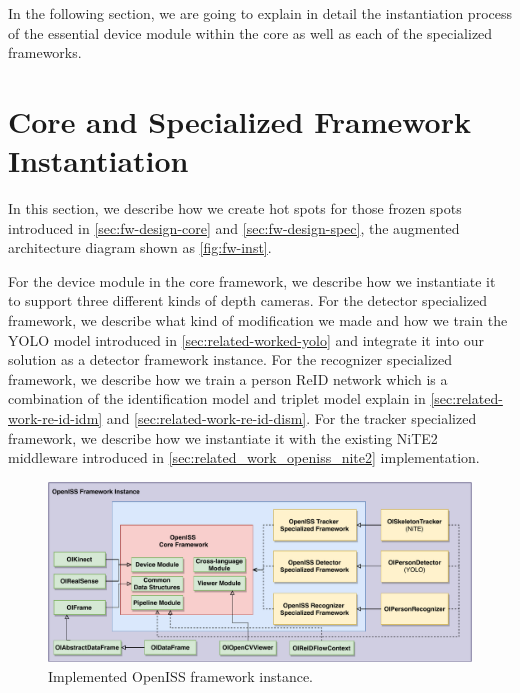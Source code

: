 
In the following section, we are going to explain in detail the instantiation
process of the essential device module within the core as well as each of the 
specialized frameworks.

\section{Core and Specialized Framework Instantiation}
\label{sec:fw-inst-core-and-spec}

In this section, we describe how we create hot spots for those frozen spots
introduced in \autoref{sec:fw-design-core} and \autoref{sec:fw-design-spec},
the augmented architecture diagram shown as \autoref{fig:fw-inst}.

For the device module in the core framework, we describe how we instantiate it 
to support three different kinds of depth cameras.
For the detector specialized framework, we describe what kind of modification we
made and how we train the YOLO model introduced in
\autoref{sec:related-worked-yolo} and integrate it into our solution as a
detector framework instance.
For the recognizer specialized framework, we describe how we train a person 
ReID network which is a combination of the identification model and triplet 
model explain in \autoref{sec:related-work-re-id-idm} and  
\autoref{sec:related-work-re-id-dism}.
For the tracker specialized framework, we describe how we instantiate it with 
the existing NiTE2 middleware introduced in 
\autoref{sec:related_work_openiss_nite2} implementation.

\begin{figure}
    \includegraphics[width=\linewidth]{figures/framework_inst.pdf}
    \caption{Implemented OpenISS framework instance.}
    \label{fig:fw-inst}
\end{figure}

